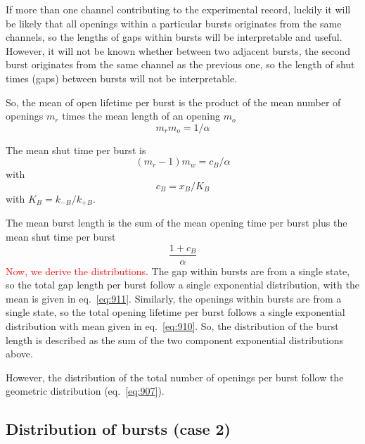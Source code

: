 \begin{framed}
  If more than one channel contributing to the experimental record,
  luckily it will be likely that all openings within a particular
  bursts originates from the same channels, so the lengths of gaps
  within bursts will be interpretable and useful. However, it will not
  be known whether between two adjacent bursts, the second burst
  originates from the same channel as the previous one, so the length
  of shut times (gaps) between bursts will not be interpretable.
\end{framed}

So, the mean of open lifetime per burst is the product of the mean
number of openings $m_r$ times the mean length of an opening $m_o$
\begin{equation}
  \label{eq:910}
  m_rm_o = 1/\alpha
\end{equation}

The mean shut time per burst is
\begin{equation}
  \label{eq:911}
  (m_r-1)m_w = c_B/\alpha
\end{equation}
with
\begin{equation}
  \label{eq:912}
  c_B=x_B/K_B
\end{equation}
with $K_B=k_{-B}/k_{+B}$.

The mean burst length is the sum of the mean opening time per burst
plus the mean shut time per burst
\begin{equation}
  \label{eq:913}
  \frac{1+c_B}{\alpha}
\end{equation}
\textcolor{red}{Now, we derive the distributions}. The gap within
bursts are from a single state, so the total gap length per burst
follow a single exponential distribution, with the mean is given in
eq.~\eqref{eq:911}. Similarly, the openings within bursts are from a
single state, so the total opening lifetime per burst follows a single
exponential distribution with mean given in eq.~\eqref{eq:910}. So,
the distribution of the burst length is described as the sum of the
two component exponential distributions above.

However, the distribution of the total number of openings per burst
follow the geometric distribution (eq.~\eqref{eq:907}).

\subsection{Distribution of bursts (case 2)}
\label{sec:distr-bursts-case}

